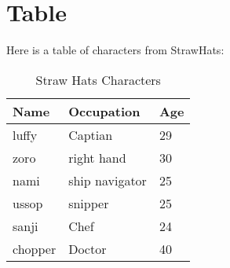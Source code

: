 \documentclass{article}
\begin{document}
\section{Table}
Here is a table of characters from StrawHats:
\begin{table}[h]
    \centering
    \caption{Straw Hats Characters}
    \begin{tabular}{@{}lll@{}}
        \toprule
        \textbf{Name} & \textbf{Occupation}      & \textbf{Age} \\ \midrule
        luffy         & Captian                     & 29           \\
        zoro       & right hand                     & 30           \\
        nami       & ship navigator                 & 25           \\
        ussop         & snipper                     & 25           \\
        sanji       & Chef                          & 24           \\ 
        chopper     & Doctor                        & 40           \\ \bottomrule
    \end{tabular}
\end{table}
\end{document}

